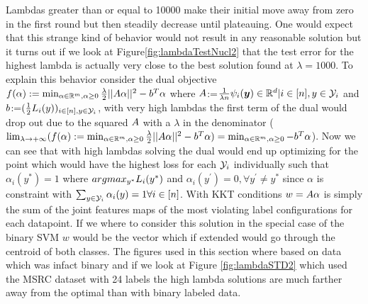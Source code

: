 \par
Lambdas greater than or equal to 10000 make their initial move away from zero in the first round but then steadily decrease until plateauing. One would expect that this strange kind of behavior would not result in any reasonable solution but it turns out if we look at Figure\ref{fig:lambdaTestNucl2} that the test error for the highest lambda is actually very close to the best solution found at $\lambda=1000$. To explain this behavior consider the dual objective $f(\alpha) := \min_{\alpha \in \mathbb{R}^m, \alpha\geq0} \frac{\lambda}{2}||A\alpha||^2-b^T\alpha$ where $A$:=$\frac{1}{\lambda n} \psi_i(\bm{y}) \in \mathbb{R}^d | i \in [n], y \in \mathcal{Y}_i$ and  $b$:=$(\frac{1}{2}L_i(y))_{i\in[n],y\in \mathcal{Y}_i}$, with very high lambdas the first term of the dual would drop out due to the squared $A$ with a $\lambda$ in the denominator ( $\lim_{\lambda \to +\infty} (f(\alpha) := \min_{\alpha \in \mathbb{R}^m, \alpha\geq0} \frac{\lambda}{2}||A\alpha||^2-b^T\alpha) = \min_{\alpha \in \mathbb{R}^m, \alpha\geq0} -b^T\alpha$). Now we can see that with high lambdas solving the dual would end up optimizing for the point which would have the highest loss for each $\mathcal{Y}_i$ individually such that $\alpha_i(y^\ast)=1$ where $argmax_{y^\ast}L_i(y^\ast) $ and $\alpha_i(y^\prime)=0, \forall y^\prime \neq y^\ast$ since $\alpha$ is constraint with $\sum_{y\in\mathcal{Y}_i} \alpha_i(y)=1 \forall i \in [n]$. With KKT conditions $w=A \alpha$ is simply the sum of the joint features maps of the most violating label configurations for each datapoint. If we where to consider this solution in the special case of the binary SVM $w$ would be the vector which if extended would go through the centroid of both classes. The figures used in this section where based on data which was infact binary \cite{ucsbData} and if we look at Figure \ref{fig:lambdaSTD2} which used the MSRC dataset with 24 labels the high lambda solutions are much farther away from the optimal than with binary labeled data.
\par




